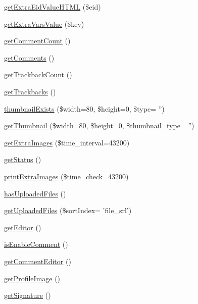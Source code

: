 \begin{DoxyCompactItemize}
\item 
\hyperlink{classdocumentItem_a52091af79c2df80f8f3c75e37adc2000}{get\+Extra\+Eid\+Value\+H\+T\+M\+L} (\$eid)
\item 
\hyperlink{classdocumentItem_ab555cb21a9a50d683836b8d4604d47f5}{get\+Extra\+Vars\+Value} (\$key)
\item 
\hyperlink{classdocumentItem_a9ed429fc56e6f95ef097645c772aa4e5}{get\+Comment\+Count} ()
\item 
\hyperlink{classdocumentItem_ad85b3da641f8bd477963d7290383e6be}{get\+Comments} ()
\item 
\hyperlink{classdocumentItem_af1520e91e8dd49202cfb93909db61c48}{get\+Trackback\+Count} ()
\item 
\hyperlink{classdocumentItem_a0c69601e59c290048081bf8d8aa7602e}{get\+Trackbacks} ()
\item 
\hyperlink{classdocumentItem_a3a8615b0ed43420047a75fb6cb719d86}{thumbnail\+Exists} (\$width=80, \$height=0, \$type= '')
\item 
\hyperlink{classdocumentItem_a033dd804282c738052af3347e9816ef4}{get\+Thumbnail} (\$width=80, \$height=0, \$thumbnail\+\_\+type= '')
\item 
\hyperlink{classdocumentItem_a0f72df4345359453aa01ff1490071c5a}{get\+Extra\+Images} (\$time\+\_\+interval=43200)
\item 
\hyperlink{classdocumentItem_aa750ee0716698bf29c9690382b7fa3ef}{get\+Status} ()
\item 
\hyperlink{classdocumentItem_a9d185a16e4439823e7e4871c2fb0659a}{print\+Extra\+Images} (\$time\+\_\+check=43200)
\item 
\hyperlink{classdocumentItem_af031d09271c9099d26b6619f9c436f68}{has\+Uploaded\+Files} ()
\item 
\hyperlink{classdocumentItem_a47ef433ba4e5147842df6c83f341d5d4}{get\+Uploaded\+Files} (\$sort\+Index= 'file\+\_\+srl')
\item 
\hyperlink{classdocumentItem_a26477197e85301bc88e35157fdcb7482}{get\+Editor} ()
\item 
\hyperlink{classdocumentItem_aff71a0f39ddc720c21c5cf39805b31a8}{is\+Enable\+Comment} ()
\item 
\hyperlink{classdocumentItem_a59ef94b52cf1a250aa4f29990e8d376d}{get\+Comment\+Editor} ()
\item 
\hyperlink{classdocumentItem_afb95c0b0d6d9106c737d8eeb51a3c834}{get\+Profile\+Image} ()
\item 
\hyperlink{classdocumentItem_a03b199ae0def81ea3a9067bbb0186f17}{get\+Signature} ()
\item 

\end{DoxyCompactItemize}
